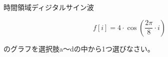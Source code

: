 時間領域ディジタルサイン波 

\[
f[i] = 4 \cdot \cos \left ( \frac{2 \pi}{8}  \cdot i \right )
\]

\noindent のグラフを選択肢a〜dの中から1つ選びなさい。
